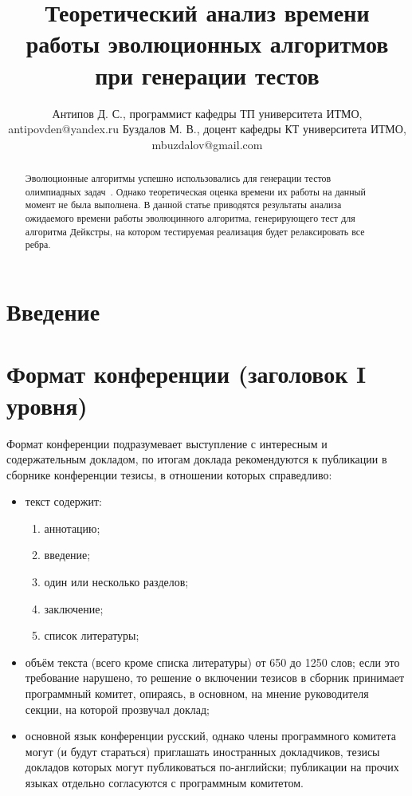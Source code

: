 \documentclass{spisok-article}
\title{Теоретический анализ времени работы эволюционных алгоритмов при генерации тестов
}
\author{
  Антипов Д. С.,
  программист кафедры ТП университета ИТМО,
  antipovden@yandex.ru
  Буздалов М. В.,
  доцент кафедры КТ университета ИТМО,
  mbuzdalov@gmail.com
}
\begin{document}
\maketitle

\begin{abstract}
Эволюционные алгоритмы успешно использовались для генерации тестов олимпиадных задач~\cite{max}.
Однако теоретическая оценка времени их работы на данный момент не была выполнена.
В данной статье приводятся результаты анализа ожидаемого времени работы эволюцинного алгоритма,
генерирующего тест для алгоритма Дейкстры, на котором тестируемая реализация будет релаксировать все ребра.
\end{abstract}

\section{Введение}



\section{Формат конференции (заголовок I уровня)}

Формат конференции подразумевает выступление с интересным и
содержательным докладом, по итогам доклада рекомендуются к публикации
в сборнике конференции тезисы, в отношении которых справедливо:

\begin{itemize}
\item
  текст содержит:
  \begin{enumerate}
  \item
    аннотацию;
  \item
    введение;
  \item
    один или несколько разделов;
  \item
    заключение;
  \item
    список литературы;
  \end{enumerate}
\item
  объём текста (всего кроме списка литературы) от 650 до 1250 слов;
  если это требование нарушено, то решение о включении тезисов в
  сборник принимает программный комитет, опираясь, в основном, на
  мнение руководителя секции, на которой прозвучал доклад;
\item
  основной язык конференции русский, однако члены программного
  комитета могут (и будут стараться) приглашать иностранных
  докладчиков, тезисы докладов которых могут публиковаться
  по-английски; публикации на прочих языках отдельно согласуются с
  программным комитетом.
\end{itemize}
\end{document}
